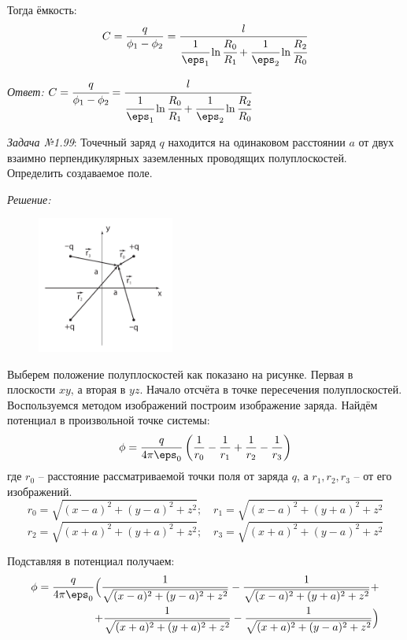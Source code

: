 Тогда ёмкость:
\[
	C = \frac{q}{\phi_1 - \phi_2} = 
	\frac{l}{ \cfrac{1}{\eps_1}\ln\cfrac{R_0}{R_1} + 
	\cfrac{1}{\eps_2}\ln\cfrac{R_2}{R_0}}
\]

\emph{Ответ:} \(
	C = \cfrac{q}{\phi_1 - \phi_2} = 
	\cfrac{l}{ \cfrac{1}{\eps_1}\ln\cfrac{R_0}{R_1} + 
	\cfrac{1}{\eps_2}\ln\cfrac{R_2}{R_0}}
\)

\newpage

\emph{Задача №1.99}: Точечный заряд \( q \) находится на одинаковом 
расстоянии \( a \) от двух взаимно перпендикулярных заземленных проводящих 
полуплоскостей. Определить создаваемое поле.

\emph{Решение:}

\begin{figure}
	\vspace{-5ex}
	\includegraphics[width=0.4\textwidth]{pdf/image_1_99}
\end{figure}

Выберем положение полуплоскостей как показано на рисунке. Первая в 
плоскости \( xy \), а вторая в \( yz \). Начало отсчёта в точке 
пересечения полуплоскостей. Воспользуемся методом изображений построим 
изображение заряда. Найдём потенциал в произвольной точке системы:
\[ 
	\phi = \frac{q}{4\pi\eps_0}\left( \frac{1}{r_0} - \frac{1}{r_1} + 
	\frac{1}{r_2} - \frac{1}{r_3} \right) 
\] 
где \( r_0 \) -- расстояние рассматриваемой точки поля от заряда \( q \), а 
\( r_1, r_2, r_3 \) -- от его изображений.
\[
	r_0 = \sqrt{(x-a)^2 + (y-a)^2 + z^2};\quad
	r_1 = \sqrt{(x-a)^2 + (y+a)^2 + z^2}
\]
\[
	r_2 = \sqrt{(x+a)^2 + (y+a)^2 + z^2};\quad
	r_3 = \sqrt{(x+a)^2 + (y-a)^2 + z^2}
\]

Подставляя в потенциал получаем:
\begin{equation*}
\begin{split}
	\phi = \frac{q}{4\pi\eps_0}\Big(
		\frac{1}{\sqrt{(x-a)^2 + (y-a)^2 + z^2}} - 
		\frac{1}{\sqrt{(x-a)^2 + (y+a)^2 + z^2}} + \\ +
		\frac{1}{\sqrt{(x+a)^2 + (y+a)^2 + z^2}} -
		\frac{1}{\sqrt{(x+a)^2 + (y-a)^2 + z^2}}
	\Big)
\end{split}
\end{equation*}

